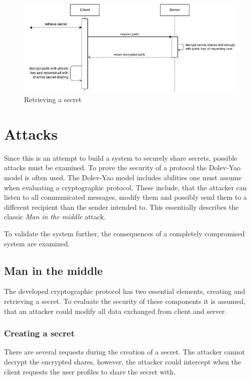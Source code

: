 \begin{figure}
  \includegraphics[scale=0.55]{pictures/retrieve_secret_sequence_diagram.png}
  \caption{Retrieving a secret}
  \label{fig:retrieving_a_secret}
\end{figure}

\section{Attacks}

Since this is an attempt to build a system to securely share secrets, possible
attacks must be examined. To prove the security of a protocol the Dolev-Yao
model is often used. The Dolev-Yao model includes abilities one must assume
when evaluating a cryptographic protocol. These include, that the attacker can
listen to all communicated messages, modify them and possibly send them to a
different recipient than the sender intended to. This essentially describes the
classic \textit{Man in the middle} attack. \cite{dolev_yao}

To validate the system further, the consequences of a completely compromised
system are examined.

\subsection{Man in the middle}

The developed cryptographic protocol has two essential elements, creating and
retrieving a secret. To evaluate the security of these components it is
assumed, that an attacker could modify all data exchanged from client and
server.

\subsubsection{Creating a secret}

There are several requests during the creation of a secret. The attacker cannot
decrypt the encrypted shares, however, the attacker could intercept when the
client requests the user profiles to share the secret with.

